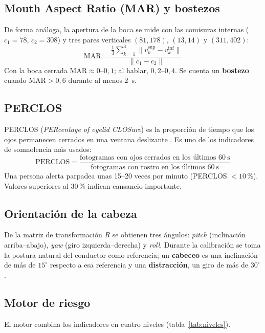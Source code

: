 \documentclass[11pt,a4paper]{article}
\begin{document}
\subsection{Mouth Aspect Ratio (MAR) y bostezos}
De forma análoga, la apertura de la boca se mide con las comisuras internas ($c_1=78$, $c_2=308$) y tres
pares verticales $(81,178)$, $(13,14)$ y $(311,402)$:
\begin{equation}
  \mathrm{MAR} = \frac{\tfrac{1}{3}\sum_{k=1}^{3}\lVert v_k^{\text{sup}} - v_k^{\text{inf}}\rVert}{\lVert c_1 - c_2\rVert}
\end{equation}
Con la boca cerrada $\mathrm{MAR}\approx 0$–$0{,}1$; al hablar, $0{,}2$–$0{,}4$. Se cuenta un
\textbf{bostezo} cuando $\mathrm{MAR}>0{,}6$ durante al menos \SI{2}{s}.

\subsection{PERCLOS}
PERCLOS (\emph{PERcentage of eyelid CLOSure}) es la proporción de tiempo que los ojos permanecen cerrados en
una ventana deslizante \cite{wierwille1994}. Es uno de los indicadores de somnolencia más usados:
\begin{equation}
  \mathrm{PERCLOS} = \frac{\text{fotogramas con ojos cerrados en los últimos } 60\ \mathrm{s}}{\text{fotogramas con rostro en los últimos } 60\ \mathrm{s}}
\end{equation}
Una persona alerta parpadea unas 15–20 veces por minuto (PERCLOS $<10$\,\%). Valores superiores al 30\,\%
indican cansancio importante.

\subsection{Orientación de la cabeza}
De la matriz de transformación $R$ se obtienen tres ángulos: \emph{pitch} (inclinación arriba–abajo),
\emph{yaw} (giro izquierda–derecha) y \emph{roll}. Durante la calibración se toma la postura natural del
conductor como referencia; un \textbf{cabeceo} es una inclinación de más de $15^\circ$ respecto a esa
referencia y una \textbf{distracción}, un giro de más de $30^\circ$.

\subsection{Motor de riesgo}
El motor combina los indicadores en cuatro niveles (tabla~\ref{tab:niveles}).
\end{document}
